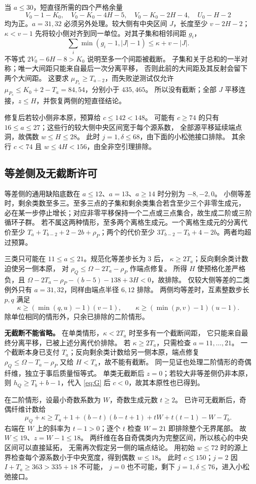 \documentclass[11pt,a4paper]{article}
\begin{document}
当 $a\le30$，短直径所需的四个严格余量
\[
 V_0-1-K_0,\quad V_0-K_0-4H-5,\quad V_0-K_0-2H-4,\quad U_0-H-2
\]
均为正。$a=31,32$ 必须另外处理。较大侧有中央区间 $J$，长度至少 $v-2H-2$；
$\kappa<v-1$ 先将较小侧对齐到同一单位。对其子集和相邻间距 $g_i$，
\[
 \sum_i\min(g_i-1,|J|-1)\le\kappa+v-|J|.
\]
不等式 $2V_0-6H-8>K_0$ 说明至多一个间距被截断。
子集和关于总和的一半对称；唯一大间距只能来自最后一次分离平移，
否则此前的大间距及其反射会留下两个大间距。
这要求 $\mu_{P_s}\ge T_{a-2}$，而失败逆测试仅允许
$\mu_{P_s}\le K_0+2-T_a=84,54$，分别小于 $435,465$。
所以没有截断；全部 $J$ 平移连接，$z\le H$，并恢复两侧的短直径结论。

修复后若较小侧非本原，预算给 $c\le142<148$。
可能有 $c\ge74$ 的只有 $16\le a\le27$；这些行的较大侧中央区间宽于每个源系数，
全部源平移延续端点洞，故偶数 $w\le H\le28$。
此时 $j=1,\delta\le68$，由下面的小松弛接口排除。
其余行 $c<74$ 且 $w\le4H<156$，由全非空引理排除。

\subsection{等差侧及无截断许可}
等差侧的通用缺陷底数在 $a\le12$、$a=13$、$a\ge14$ 时分别为 $-8,-2,0$。
小侧等差时，剩余类数至多三。至多三点的子集和剩余类集合若含至少三个非零生成元，
必在某一步停止增长；对应非零平移保持一个二点或三点集合，故生成二阶或三阶循环子群。
若不属这两种情形，至多两个离格生成元。一个离格生成元的分离代价至少
$T_a+T_{b-2}+2-2b+\rho_P$；两个的代价至少
$3T_{b-2}-T_b+4-2b$。两者均超过预算。

三类只可能在 $11\le a\le21$。规范化等差步长为 3 后，
$\kappa\ge2T_a$；反向剩余类计数迫使另一侧本原，
对 $\rho_Q\le\Omega-2T_a-\rho_P$ 作端点修复。
所得 $H$ 使预格化差严格负，且
$\Omega-2T_a-\rho_P-(b-5)-138+3H<0$，故排除。
仅较大侧等差的二类例外只有 $a=31,32$，同样由端点半径 $6,12$ 排除。
两侧均等差时，互素整数步长 $p,q$ 满足
\[
 \kappa\ge(\min(q,u)-1)(v-1),\qquad
 \kappa\ge(\min(p,v)-1)(u-1).
\]
除单位相同的情形外，只余已排除的二阶情形。

\textbf{无截断不能省略。} 在单类情形，$\kappa<2T_a$ 时至多有一个截断间距，
它只能来自最终分离平移，已被上述分离代价排除。
若 $\kappa\ge2T_a$，只需检查 $a=11,\ldots,21$。
一个截断本身已支付 $T_a$；反向剩余类计数给另一侧本原，端点修复
$\rho_Q\le\Omega-T_a-\rho_P$ 又给 $H<T_a$，故不能有截断。
同一见证也处理二阶情形的奇偶纤维，独立于事后质量恒等式。
单类无截断后 $z=0$；若较大非等差侧仍非本原，则
$h_Q\ge T_b+b-1$，代入 \eqref{eq:G} 后 $c<0$，故其本原性也已得到。

在二阶情形，设最小奇数系数为 $W$，奇数生成元数 $t\ge2$。
已许可无截断后，奇偶纤维计数给
\[
 \mu_Q+\kappa\ge
 T_a+1+(b-t)(b-t+1)+tW+t(t-1)-W-T_b.
\]
右端在 $W$ 上的斜率为 $t-1>0$；逐个 $t$ 检查 $W=21$ 即排除整个无界尾部。
故 $W\le19$、$z=W-1\le18$。
两纤维在各自奇偶类内为完整区间，所以核心的中央区间可以直接延拓，
无需再次假定另一侧的端点结论。
用初始 $w\le72$ 时的源上界检查每个源系数小于中央宽度，得到偶数 $w\le18$。
此时 $c\le150$；$j=2$ 因 $I+T_a\ge363>335+18$ 不可能，
$j=0$ 也不可能，剩下 $j=1,\delta\le76$，进入小松弛接口。
\end{document}
